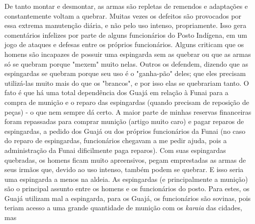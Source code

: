 De tanto montar e desmontar, as armas são repletas de remendos e
adaptações e constantemente voltam a quebrar. Muitas vezes os defeitos
são provocados por essa extrema manutenção diária, e não pelo uso
intenso, propriamente. Isso gera comentários infelizes por parte de
alguns funcionários do Posto Indígena, em um jogo de ataques e defesas
entre os próprios funcionários. Alguns criticam que os homens são
incapazes de possuir uma espingarda sem as quebrar ou que as armas só se
quebram porque "mexem" muito nelas. Outros os defendem, dizendo que as
espingardas se quebram porque seu uso é o "ganha-pão" deles; que eles
precisam utilizá-las muito mais do que os "brancos", e por isso elas se
quebrariam tanto. O fato é que há uma total dependência dos Guajá em
relação à Funai para a compra de munição e o reparo das espingardas
(quando precisam de reposição de peças) - o que nem sempre dá certo. A
maior parte de minhas reservas financeiras foram repassadas para comprar
munição (artigo muito caro) e pagar reparos de espingardas, a pedido dos
Guajá ou dos próprios funcionários da Funai (no caso do reparo de
espingardas, funcionários chegavam a me pedir ajuda, pois a
administração da Funai dificilmente paga reparos). Com suas espingardas
quebradas, os homens ficam muito apreensivos, pegam emprestadas as armas
de seus irmãos que, devido ao uso intenso, também podem se quebrar. E
isso seria uma espingarda a menos na aldeia. As espingardas (e
principalmente a munição) são o principal assunto entre os homens e os
funcionários do posto. Para estes, os Guajá utilizam mal a espingarda,
para os Guajá, os funcionários são sovinas, pois teriam acesso a uma
grande quantidade de munição com os \emph{karaia} das cidades, mas

